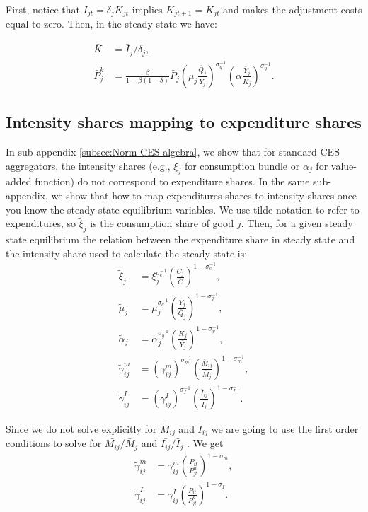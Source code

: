 First, notice that $I_{jt}=\delta_{j}K_{jt}$ implies $K_{jt+1}=K_{jt}$ and makes the adjustment costs equal to zero. Then, in the steady
state we have:

\begin{align*}
\bar{{K}} & =\bar{{I}}_{j}/\delta_{j},\\
\bar{{P}}_{j}^{k} & =\frac{\beta}{1-\beta(1-\delta)}\bar{{P}}_{j}\left(\mu_{j}\frac{{\bar{{Q}}_{j}}}{\bar{{Y}}_{j}}\right)^{\sigma_{q}^{-1}}\left(\alpha\frac{{\bar{{Y}}_{j}}}{\bar{{K}}_{j}}\right)^{\sigma_{y}^{-1}}.
\end{align*}


\subsection{Intensity shares mapping to expenditure shares\label{subsec:expend_shares}}

In sub-appendix \ref{subsec:Norm-CES-algebra}, we show that for standard
CES aggregators, the intensity shares (e.g., $\xi_{j}$ for consumption
bundle or $\alpha_{j}$ for value-added function) do not correspond
to expenditure shares. In the same sub-appendix, we show that how
to map expenditures shares to intensity shares once you know the steady
state equilibrium variables. We use tilde notation to refer to expenditures,
so $\tilde{{\xi}}_{j}$ is the consumption share of good $j$. Then,
for a given steady state equilibrium the relation between the expenditure
share in steady state and the intensity share used to calculate the
steady state is:
\begin{align*}
\tilde{{\xi}}_{j} & =\xi_{j}^{\sigma_{c}^{-1}}\left(\frac{\bar{{C}}_{j}}{\bar{{C}}}\right)^{1-\sigma_{c}^{-1}},\\
\tilde{{\mu}}_{j} & =\mu_{j}^{\sigma_{q}^{-1}}\left(\frac{\bar{{Y}}_{j}}{\bar{{Q}}_{j}}\right)^{1-\sigma_{q}^{-1}},\\
\tilde{{\alpha}}_{j} & =\alpha_{j}^{\sigma_{y}^{-1}}\left(\frac{\bar{{K}}_{j}}{\bar{{Y}_{j}}}\right)^{1-\sigma_{y}^{-1}},\\
\tilde{{\gamma}}_{ij}^{m} & =\left(\gamma_{ij}^{m}\right)^{\sigma_{m}^{-1}}\left(\frac{\bar{{M}}_{ij}}{\bar{{M}}_{j}}\right)^{1-\sigma_{m}^{-1}},\\
\tilde{{\gamma}}_{ij}^{I} & =\left(\gamma_{ij}^{I}\right)^{\sigma_{I}^{-1}}\left(\frac{\bar{{I}}_{ij}}{\bar{{I}}_{j}}\right)^{1-\sigma_{I}^{-1}}.
\end{align*}

Since we do not solve explicitly for $\bar{{M}}_{ij}$ and $\bar{{I}}_{ij}$
we are going to use the first order conditions to solve for $\bar{{M}_{ij}}/\bar{{M}}_{j}$
and $\bar{{I}_{ij}}/\bar{{I}}_{j}$ . We get 
\begin{align*}
\tilde{{\gamma}}_{ij}^{m} & =\gamma_{ij}^{m}\left(\frac{{P_{it}}}{P_{jt}^{m}}\right)^{1-\sigma_{m}},\\
\tilde{{\gamma}}_{ij}^{I} & =\gamma_{ij}^{I}\left(\frac{{P_{it}}}{P_{jt}^{k}}\right)^{1-\sigma_{I}}.
\end{align*}

